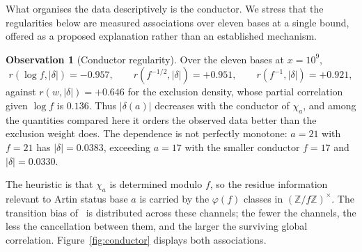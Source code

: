 \documentclass[11pt,reqno]{amsart}
\theoremstyle{plain}
\theoremstyle{definition}
\newtheorem{observation}[theorem]{Observation}
\newcommand{\Z}{\mathbb{Z}}
\begin{document}
What organises the data descriptively is the conductor. We stress that the
regularities below are measured associations over eleven bases at a single
bound, offered as a proposed explanation rather than an established
mechanism.

\begin{observation}[Conductor regularity]
\label{obs:conductor}
Over the eleven bases at $x = 10^9$,
\[
  r(\log f, |\delta|) = -0.957, \qquad
  r(f^{-1/2}, |\delta|) = +0.951, \qquad
  r(f^{-1}, |\delta|) = +0.921,
\]
against $r(w, |\delta|) = +0.646$ for the exclusion density, whose partial
correlation given $\log f$ is $0.136$. Thus $|\delta(a)|$ decreases with the
conductor of $\chi_a$, and among the quantities compared here it orders the observed data better
than the exclusion weight does. The dependence is not perfectly
monotone: $a = 21$ with $f = 21$ has $|\delta| = 0.0383$, exceeding $a = 17$
with the smaller conductor $f = 17$ and $|\delta| = 0.0330$.
\end{observation}

The heuristic is that $\chi_a$ is determined modulo $f$, so the residue
information relevant to Artin status base $a$ is carried by the
$\varphi(f)$ classes in $(\Z/f\Z)^\times$. The transition bias
of~\cite{LOS2016} is distributed across these channels; the fewer the channels,
the less the cancellation between them, and the larger the surviving global
correlation. Figure~\ref{fig:conductor} displays both associations.
\end{document}
